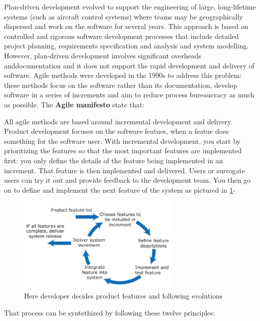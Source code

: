 \documentclass[10pt,a4paper]{report}
\begin{document}
Plan-driven development evolved to support the engineering of large, long-lifetime systems (such as aircraft control systems) where teams may be geographically dispersed and work on the software for several years.
This approach is based on controlled and rigorous software development processes that include detailed project planning, requirements specification and analysis and system modelling.
However, plan-driven development involves significant overheads anddocumentation and it does not support the rapid development and delivery of software.
Agile methods were developed in the 1990s to address this problem: these methods focus on the software rather than its documentation, develop software in a series of increments and aim to reduce process bureaucracy as much as possible.
The \textbf{Agile manifesto} state that: 

All agile methods are based around incremental development and delivery. Product development focuses on the software featues, when a featue does something for the software user. With incremental development, you start by prioritizing the features so that the most important features are implemented first:
you only define the details of the feature being implemented in an increment. That feature is then implemented and delivered.
Users or surrogate users can try it out and provide feedback to the development team. You then go on to define and implement the next feature of the system as pictured in \ref{image07}-
\begin{figure}[h]
	\centering
	\includegraphics[width=0.7\textwidth]{image07}
	\caption{Here developer decides product features and following evolutions}
	\label{image07}
\end{figure}
That process can be syntethized by following these twelve principles:
\end{document}
